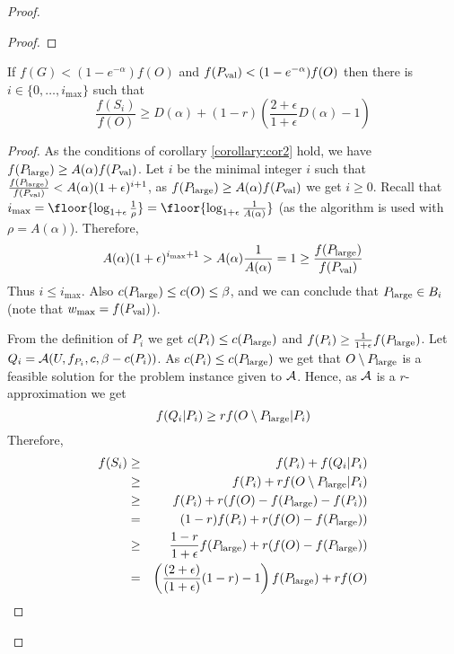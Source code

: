 \begin{proof}
\begin{proof}
			
		\end{proof}

	\begin{corollary}
		\label{corollary:cor3}
			If $f(G)< (1-e^{-\alpha})f(O)$ and $f(P_{\text{val}}) < (1-e^{-\alpha})f(O)$ then
			there is $i\in \{0, \ldots, i_{\max}\}$ such that 
		$$\frac{f(S_i)}{f(O)} \geq D(\alpha) + (1-r)\left( \frac{2+\epsilon}{1+\epsilon} D(\alpha) -1 \right)$$
	\end{corollary}
\begin{proof}
		As the conditions of corollary \ref{corollary:cor2} hold, we have
		$f(P_{\text{large}}) \geq A(\alpha) f(P_{\text{val}})$.
		 Let $i$ be the minimal integer $i$ such
		that $\frac{f(P_{\text{large}})}{f(P_{\text{val}})} < A(\alpha)(1+\epsilon) ^{i+1}$, as $f(P_{\text{large}}) \geq A(\alpha) f(P_{\text{val}})$ we get $i\geq 0$. 
		Recall that $i_{\max}= \floor{\log_{1+\epsilon} \frac{1}{\rho} } = 
		\floor{\log_{1+\epsilon} \frac{1}{A(\alpha)}} $ (as the algorithm is used 
			with $\rho=A(\alpha)$). 
			Therefore,
			$$A(\alpha) (1+\epsilon) ^{i_{\max} +1} 
			> A(\alpha) \frac{1}{A(\alpha) } = 1 \geq \frac{f(P_{\text{large}})}{f(P_{\text{val}})}$$
			Thus $i\leq i_{\max}$. 
			Also $c(P_{\text{large}}) \leq c(O) \leq \beta$, and we can conclude that 
			$P_{\text{large}} \in B_i$ (note that $w_{\max} = f(P_{\text{val}})$).
			
			From the definition of $P_i$ we get $c(P_i)\leq c(P_{\text{large}})$ and 
			$f(P_i) \geq \frac{1}{1+\epsilon} f(P_{\text{large}})$. 
			Let $Q_i  =  \mathcal{A}(U, f_{P_i}, c, \beta - c(P_i))$. 
			As $c(P_i) \leq c(P_{\text{large}})$ we get that $O\setminus P_{\text{large}}$ 
			is a feasible solution for the problem instance given to $\mathcal{A}$. 
			Hence, as $\mathcal{A}$ is a $r$-approximation we get
			$$f(Q_i | P_i) \geq r f(O\setminus P_{\text{large}}| P_i)$$
			Therefore,
			\begin{align*}
			f(S_{i}) 
			&
			\geq& f(P_i) + f(Q_i|P_i)
			\\ & 
			\geq& f(P_i) + r f(O \setminus P_{\text{large}} | P_i)
			\\ & 
			\geq& f(P_i) + r(f(O) - f(P_{\text{large}}) - f(P_i))
			\\ &
			=& (1-r)f(P_i) + r(f(O) - f(P_{\text{large}}))
			\\ & 
			\geq& \frac{1-r}{1 + \epsilon}f(P_{\text{large}}) + r(f(O) - f(P_{\text{large}}))
			\\ &
			= &\left(
			\frac{(2 + \epsilon)}{(1 + \epsilon)}(1-r) - 1
			\right)
			f(P_{\text{large}})
			+ rf(O)
			\label{eq:sub:bucket}
			\end{align*}
			

\end{proof}
\end{proof}
